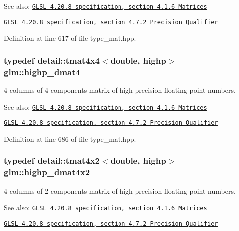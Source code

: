 \begin{Desc}
\item[See also:]\href{http://www.opengl.org/registry/doc/GLSLangSpec.4.20.8.pdf}{\tt GLSL 4.20.8 specification, section 4.1.6 Matrices} 

\href{http://www.opengl.org/registry/doc/GLSLangSpec.4.20.8.pdf}{\tt GLSL 4.20.8 specification, section 4.7.2 Precision Qualifier} \end{Desc}


Definition at line 617 of file type\_\-mat.hpp.\hypertarget{group__core__precision_g9a5d95e476d451d28d3939ac7f124baf}{
\subsubsection[highp\_\-dmat4]{\setlength{\rightskip}{0pt plus 5cm}typedef detail::tmat4x4$<$double, highp$>$ {\bf glm::highp\_\-dmat4}}}
\label{group__core__precision_g9a5d95e476d451d28d3939ac7f124baf}


4 columns of 4 components matrix of high precision floating-point numbers.

\begin{Desc}
\item[See also:]\href{http://www.opengl.org/registry/doc/GLSLangSpec.4.20.8.pdf}{\tt GLSL 4.20.8 specification, section 4.1.6 Matrices} 

\href{http://www.opengl.org/registry/doc/GLSLangSpec.4.20.8.pdf}{\tt GLSL 4.20.8 specification, section 4.7.2 Precision Qualifier} \end{Desc}


Definition at line 686 of file type\_\-mat.hpp.\hypertarget{group__core__precision_ga4fb1ed350a6cd053abb9b093d13ce0d}{
\subsubsection[highp\_\-dmat4x2]{\setlength{\rightskip}{0pt plus 5cm}typedef detail::tmat4x2$<$double, highp$>$ {\bf glm::highp\_\-dmat4x2}}}
\label{group__core__precision_ga4fb1ed350a6cd053abb9b093d13ce0d}


4 columns of 2 components matrix of high precision floating-point numbers.

\begin{Desc}
\item[See also:]\href{http://www.opengl.org/registry/doc/GLSLangSpec.4.20.8.pdf}{\tt GLSL 4.20.8 specification, section 4.1.6 Matrices} 

\href{http://www.opengl.org/registry/doc/GLSLangSpec.4.20.8.pdf}{\tt GLSL 4.20.8 specification, section 4.7.2 Precision Qualifier} \end{Desc}


